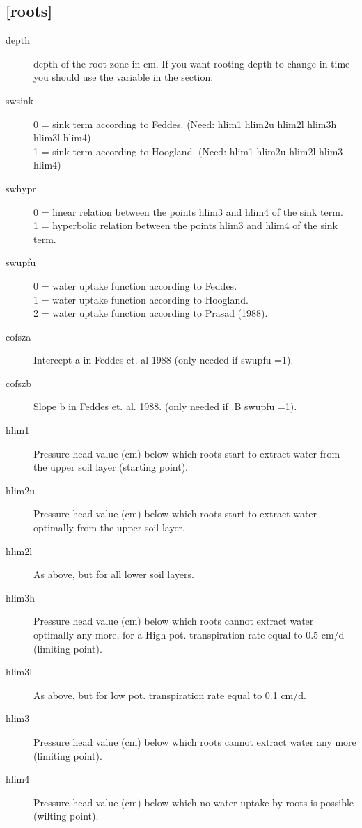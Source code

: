\subsection{[roots]}\label{section:roots}
\begin{description}
\item[depth]
depth of the root zone in cm. If you want rooting depth to change in
time you should use the  variable in the 
section.

\item[swsink]
0 = sink term according to Feddes. (Need: hlim1 hlim2u hlim2l hlim3h
hlim3l hlim4)\\ 
1 = sink term according to Hoogland. (Need: hlim1
hlim2u hlim2l hlim3 hlim4) 

\item[swhypr] 0 = linear relation between
the points hlim3 and hlim4 of the sink term.\\
1 = hyperbolic
relation between the points hlim3 and hlim4 of the sink term.

\item[swupfu]
0 = water uptake function according to Feddes.\\
1 = water uptake function according to Hoogland.\\
2 = water uptake function according to Prasad (1988).

\item[cofsza] Intercept a in Feddes et. al 1988 (only needed if swupfu =1).

\item[cofszb] Slope b in Feddes et. al. 1988. (only needed if .B swupfu =1).

\item[hlim1] 
Pressure head value (cm) below which roots start to extract water from
the upper soil layer (starting point).

\item[hlim2u]
Pressure head
value (cm) below which roots start to extract water optimally from the
upper soil layer.

\item[hlim2l] 
As above, but for all lower soil layers.

\item[hlim3h]
Pressure head value (cm) below which roots cannot extract water
optimally any more, for a High pot. transpiration rate equal to 0.5
cm/d (limiting point).

\item[hlim3l] 
As above, but for low pot. transpiration rate equal to 0.1 cm/d.

\item[hlim3]
Pressure head value (cm) below which roots cannot extract water any
more (limiting point).

\item[hlim4]
Pressure head value (cm) below which no water uptake by roots is
possible (wilting point).
\end{description}

